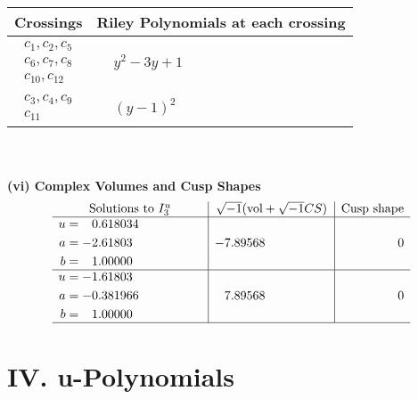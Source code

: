 \documentclass[1p]{elsarticle_modified}
\theoremstyle{definition}
\newcommand{\I}{\sqrt{-1}}
\begin{document}
\begin{tabular}{m{50pt}|m{274pt}}
Crossings & \hspace{64pt}Riley Polynomials at each crossing \\
\hline $$\begin{aligned}c_{1},c_{2},c_{5}\\c_{6},c_{7},c_{8}\\c_{10},c_{12}\end{aligned}$$&$\begin{aligned}
&y^2-3 y+1
\end{aligned}$\\
\hline $$\begin{aligned}c_{3},c_{4},c_{9}\\c_{11}\end{aligned}$$&$\begin{aligned}
&(y-1)^2
\end{aligned}$\\
\hline
\end{tabular}\\~\\
\newpage\flushleft \textbf{(vi) Complex Volumes and Cusp Shapes}
$$\begin{array}{c|c|c}  
\text{Solutions to }I^u_{3}& \I (\text{vol} + \sqrt{-1}CS) & \text{Cusp shape}\\
 \hline 
\begin{aligned}
u &= \phantom{-}0.618034\phantom{ +0.000000I} \\
a &= -2.61803\phantom{ +0.000000I} \\
b &= \phantom{-}1.00000\phantom{ +0.000000I}\end{aligned}
 & -7.89568\phantom{ +0.000000I} & \phantom{-0.000000 } 0 \\ \hline\begin{aligned}
u &= -1.61803\phantom{ +0.000000I} \\
a &= -0.381966\phantom{ +0.000000I} \\
b &= \phantom{-}1.00000\phantom{ +0.000000I}\end{aligned}
 & \phantom{-}7.89568\phantom{ +0.000000I} & \phantom{-0.000000 } 0\\
 \hline 
 \end{array}$$\newpage
\newpage\renewcommand{\arraystretch}{1}
\centering \section*{ IV. u-Polynomials}
\end{document}
